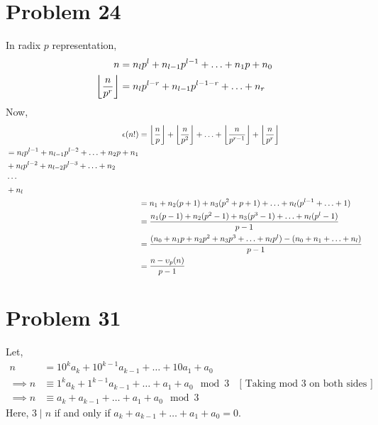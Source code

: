 \section*{Problem 24}
In radix $p$ representation,
\begin{align*}
    n                      & = n_lp^l + n_{l-1}p^{l-1} +  \ldots + n_1p + n_0 \\
    \floor*{\frac{n}{p^r}} & = n_lp^{l-r} + n_{l-1}p^{l-1-r} +  \ldots + n_r  \\
\end{align*}
Now,
\begin{align*}
    \epsilon(n!) & = \floor*{\frac{n}{p}} + \floor*{\frac{n}{p^2}} + \ldots + \floor*{\frac{n}{p^{r-1}}} + \floor*{\frac{n}{p^{r}}} \\
    \begin{split}
        &=n_lp^{l-1} + n_{l-1}p^{l-2} + \ldots + n_2p + n_1 \\
        &+n_lp^{l-2} + n_{l-2}p^{l-3} + \ldots + n_2\\
        &\cdots\\
        &+n_l
    \end{split}                                                                             \\
                 & =n_1 + n_2(p+1) + n_3(p^2+p+1) + \ldots + n_l(p^{l-1} + \ldots + 1)                                              \\
                 & =\frac{n_1(p-1) + n_2(p^2-1) + n_3(p^3-1) + \ldots + n_l(p^l-1)}{p-1}                                            \\
                 & =\frac{(n_0 + n_1p + n_2p^2 + n_3p^3 + \ldots + n_lp^l)-(n_0 + n_1 + \ldots + n_l)}{p-1}                         \\
                 & =\frac{n-\upsilon_p(n)}{p-1}
\end{align*}
\section*{Problem 31}
Let,
\begin{align*}
    n          & = 10^k a_k  +  10^{k-1} a_{k-1} + \ldots + 10 a_1 + a_0                                                   \\
    \implies n & \equiv 1^ka_k + 1^{k-1}a_{k-1} + \ldots + a_1 + a_0 \mod{3} \quad \text{[ Taking mod $3$ on both sides ]} \\
    \implies n & \equiv a_k + a_{k-1} + \ldots + a_1 + a_0 \mod{3}
\end{align*}
Here, $3\mid n$ if and only if $a_k + a_{k-1} + \ldots + a_1 + a_0 = 0$.\\

